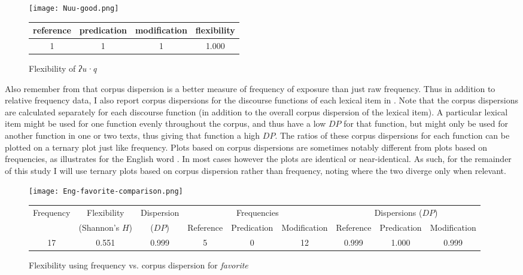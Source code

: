 \begin{figure}

  \centering
  \caption{Flexibility of  \textit{ʔu·q} }
  \label{fig:Nuu-good}

  \texttt{[image: Nuu-good.png]}

  \begin{tabular}{ c c c c }
    \toprule
    reference & predication & modification & flexibility\\
    \midrule
    1         & 1           & 1            & 1.000      \\
    \bottomrule
  \end{tabular}

\end{figure}

Also remember from  that corpus dispersion is a better measure of frequency of exposure than just raw frequency. Thus in addition to relative frequency data, I also report corpus dispersions for the discourse functions of each lexical item in . Note that the corpus dispersions are calculated separately for each discourse function (in addition to the overall corpus dispersion of the lexical item). A particular lexical item might be used for one function evenly throughout the corpus, and thus have a low $DP$ for that function, but might only be used for another function in one or two texts, thus giving that function a high $DP$. The ratios of these corpus dispersions for each function can be plotted on a ternary plot just like frequency. Plots based on corpus dispersions are sometimes notably different from plots based on frequencies, as  illustrates for the English word . In most cases however the plots are identical or near-identical. As such, for the remainder of this study I will use ternary plots based on corpus dispersion rather than frequency, noting where the two diverge only when relevant.

\begin{landscape}
\begin{figure}

  \centering
  \caption{Flexibility using frequency vs. corpus dispersion for  \textit{favorite}}
  \label{fig:plot-frequency-vs-dispersion}

  \texttt{[image: Eng-favorite-comparison.png]}

  \begin{tabular}{ c c c c c c c c c }
    \toprule
    Frequency & Flexibility     & Dispersion & \multicolumn{3}{c}{Frequencies}        & \multicolumn{3}{c}{Dispersions ($DP$)}\\
    { }       & (Shannon's $H$) & ($DP$)     & Reference & Predication & Modification & Reference & Predication & Modification\\
    \midrule
    17        & 0.551           & 0.999      & 5         & 0           & 12           & 0.999     & 1.000       & 0.999       \\
    \bottomrule
  \end{tabular}

\end{figure}
\end{landscape}

